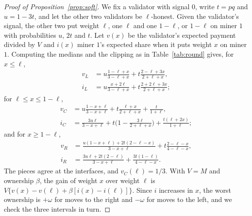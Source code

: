 \documentclass[sigconf,anonymous,review]{acmart}
\numberwithin{equation}{section}
\begin{document}
\begin{proof}[Proof of Proposition~\ref{prop:soft}]
We fix a validator with signal $0$, write $t=pq$ and $u=1-3t$, and let the
other two validators be $\ell$-honest. Given the validator's signal, the other
two put weight $\ell$, one $\ell$ and one $1-\ell$, or $1-\ell$ on miner $1$
with probabilities $u$, $2t$ and $t$. Let $v(x)$ be the validator's expected
payment divided by $V$ and $i(x)$ miner $1$'s expected share when it puts weight
$x$ on miner $1$. Computing the medians and the clipping as in
Table~\ref{tab:round} gives, for $x\le\ell$,
\begin{align*}
v_L&=u\tfrac{1-\ell+x}{3-\ell+x}+t\tfrac{2-\ell+3x}{2+\ell+x},\\
i_L&=u\tfrac{x+2\ell}{3-\ell+x}+t\tfrac{2+2\ell+3x}{2+\ell+x};
\end{align*}
for $\ell\le x\le1-\ell$,
\begin{align*}
v_C&=u\tfrac{1-x+\ell}{3-x+\ell}+t\tfrac{\ell+x}{2+\ell+x}+\tfrac{t}{1+\ell},\\
i_C&=\tfrac{3u\ell}{3-x+\ell}+t\bigl(1-\tfrac{3\ell}{2+\ell+x}\bigr)+\tfrac{t(\ell+2x)}{1+\ell};
\end{align*}
and for $x\ge1-\ell$,
\begin{align*}
v_R&=\tfrac{u(1-x+\ell)+2t(2-\ell-x)}{3-x+\ell}+t\tfrac{2-\ell-x}{4-\ell-x},\\
i_R&=\tfrac{3u\ell+2t(2-\ell)}{3-x+\ell}+\tfrac{3t(1-\ell)}{4-\ell-x}.
\end{align*}
The pieces agree at the interfaces, and $v_C(\ell)=1/3$. With $V=M$ and
ownership $\beta$, the gain of weight $x$ over weight $\ell$ is
$V\{v(x)-v(\ell)+\beta[i(x)-i(\ell)]\}$. Since $i$ increases in $x$, the worst
ownership is $+\omega$ for moves to the right and $-\omega$ for moves to the
left, and we check the three intervals in turn.


\end{proof}
\end{document}
